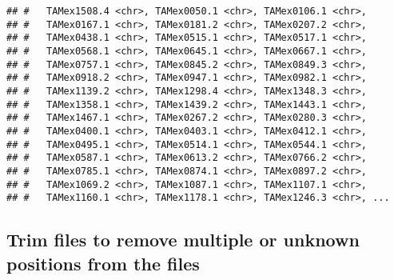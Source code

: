 \documentclass[]{article}
\newenvironment{Shaded}{\begin{snugshade}}{\end{snugshade}}
\newcommand{\KeywordTok}[1]{\textcolor[rgb]{0.13,0.29,0.53}{\textbf{#1}}}
\newcommand{\StringTok}[1]{\textcolor[rgb]{0.31,0.60,0.02}{#1}}
\newcommand{\OperatorTok}[1]{\textcolor[rgb]{0.81,0.36,0.00}{\textbf{#1}}}
\newcommand{\NormalTok}[1]{#1}
\begin{document}
\begin{verbatim}
## #   TAMex1508.4 <chr>, TAMex0050.1 <chr>, TAMex0106.1 <chr>,
## #   TAMex0167.1 <chr>, TAMex0181.2 <chr>, TAMex0207.2 <chr>,
## #   TAMex0438.1 <chr>, TAMex0515.1 <chr>, TAMex0517.1 <chr>,
## #   TAMex0568.1 <chr>, TAMex0645.1 <chr>, TAMex0667.1 <chr>,
## #   TAMex0757.1 <chr>, TAMex0845.2 <chr>, TAMex0849.3 <chr>,
## #   TAMex0918.2 <chr>, TAMex0947.1 <chr>, TAMex0982.1 <chr>,
## #   TAMex1139.2 <chr>, TAMex1298.4 <chr>, TAMex1348.3 <chr>,
## #   TAMex1358.1 <chr>, TAMex1439.2 <chr>, TAMex1443.1 <chr>,
## #   TAMex1467.1 <chr>, TAMex0267.2 <chr>, TAMex0280.3 <chr>,
## #   TAMex0400.1 <chr>, TAMex0403.1 <chr>, TAMex0412.1 <chr>,
## #   TAMex0495.1 <chr>, TAMex0514.1 <chr>, TAMex0544.1 <chr>,
## #   TAMex0587.1 <chr>, TAMex0613.2 <chr>, TAMex0766.2 <chr>,
## #   TAMex0785.1 <chr>, TAMex0874.1 <chr>, TAMex0897.2 <chr>,
## #   TAMex1069.2 <chr>, TAMex1087.1 <chr>, TAMex1107.1 <chr>,
## #   TAMex1160.1 <chr>, TAMex1178.1 <chr>, TAMex1246.3 <chr>, ...
\end{verbatim}

\subsection{Trim files to remove multiple or unknown positions from the
files}\label{trim-files-to-remove-multiple-or-unknown-positions-from-the-files}

\begin{Shaded}
\end{Shaded}
\end{document}

